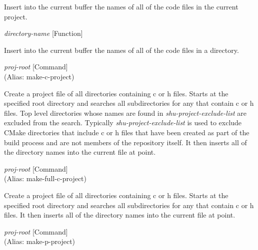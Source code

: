 \begin{doc-string}
Insert into the current buffer the names of all of the code files in the
current project.
\end{doc-string}

\vspace{1em}
\noindent
{}
\usebox{\funcname}\emph{directory-name}
 \hfill [Function]

\begin{doc-string}
Insert into the current buffer the names of all of the code files in a directory.
\end{doc-string}

\vspace{1em}
\noindent
{}
\usebox{\funcname}\emph{proj-root}
 \hfill [Command]\\%
 (Alias: make-c-project)

\begin{doc-string}
Create a project file of all directories containing c or h files.  Starts at
the specified root directory and searches all subdirectories for any that
contain c or h files.  Top level directories whose names are found in
\emph{shu-project-exclude-list} are excluded from the search.  Typically
\emph{shu-project-exclude-list} is used to exclude CMake directories that include c or
h files that have been created as part of the build process and are not members
of the repository itself.  It then inserts all of the directory names into the
current file at point.
\end{doc-string}

\vspace{1em}
\noindent
{}
\usebox{\funcname}\emph{proj-root}
 \hfill [Command]\\%
 (Alias: make-full-c-project)

\begin{doc-string}
Create a project file of all directories containing c or h files.
Starts at the specified root directory and searches all subdirectories for
any that contain c or h files.  It then inserts all of the directory names
into the current file at point.
\end{doc-string}

\vspace{1em}
\noindent
{}
\usebox{\funcname}\emph{proj-root}
 \hfill [Command]\\%
 (Alias: make-p-project)

